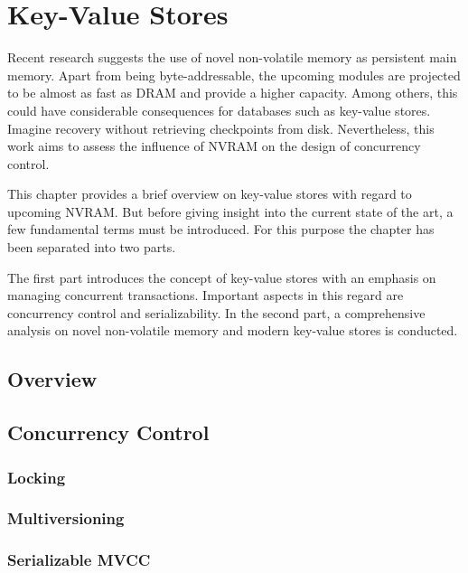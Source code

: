 \chapter{Key-Value Stores}
\label{ch:domain}


Recent research suggests the use of novel non-volatile memory as persistent 
main memory. Apart from being byte-addressable, the upcoming modules are 
projected to be almost as fast as DRAM and provide a higher capacity. Among 
others, this could have considerable consequences for databases such as 
key-value stores. Imagine recovery without retrieving checkpoints from disk. 
Nevertheless, this work aims to assess the influence of NVRAM on the design of 
concurrency control. 


This chapter provides a brief overview on key-value stores with regard to 
upcoming NVRAM. But before giving insight into the current state of the art, 
a few fundamental terms must be introduced. For this purpose the chapter has 
been separated into two parts.


The first part introduces the concept of key-value stores with an emphasis on 
managing concurrent transactions. Important aspects in this regard are 
concurrency control and serializability. In the second part, a comprehensive 
analysis on novel non-volatile memory and modern key-value stores is conducted.


%


%

\section{Overview}
\section{Concurrency Control}
\subsection{Locking}
\subsection{Multiversioning}
\subsection{Serializable MVCC}

